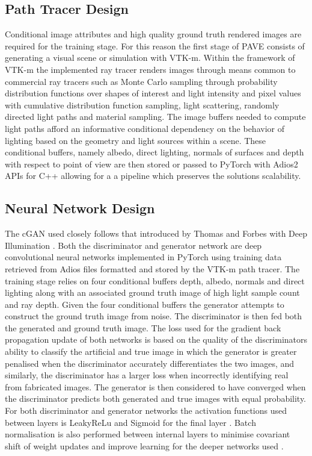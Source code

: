 \documentclass[conference]{IEEEtran}
\begin{document}
\subsection{Path Tracer Design}

Conditional image attributes and high quality ground truth rendered images are required for the training stage. For this reason the first stage of PAVE consists of generating a visual scene or simulation with VTK-m. Within the framework of VTK-m the implemented ray tracer renders images through means common to commercial ray tracers such as Monte Carlo sampling through probability distribution functions over shapes of interest and light intensity and pixel values with cumulative distribution function sampling, light scattering, randomly directed light paths and material sampling. The image buffers needed to compute light paths afford an informative conditional dependency on the behavior of lighting based on the geometry and light sources within a scene. These conditional buffers, namely albedo, direct lighting, normals of surfaces and depth with respect to point of view are then stored or passed to PyTorch with Adios2 APIs for C++ allowing for a a pipeline which preserves the solutions scalability. 

\subsection{Neural Network Design}

The cGAN used closely follows that introduced by Thomas and Forbes with Deep Illumination \cite{deepillum}. Both the discriminator and generator network are deep convolutional neural networks implemented in PyTorch using training data retrieved from Adios files formatted and stored by the VTK-m path tracer. The training stage relies on four conditional buffers depth, albedo, normals and direct lighting along with an associated ground truth image of high light sample count and ray depth. Given the four conditional buffers the generator attempts to construct the ground truth image from noise. The discriminator is then fed both the generated and ground truth image. The loss used for the gradient back propagation update of both networks is based on the quality of the discriminators ability to classify the artificial and true image in which the generator is greater penalised when the discriminator accurately differentiates the two images, and similarly, the discriminator has a larger loss when incorrectly identifying real from fabricated images. The generator is then considered to have converged when the discriminator predicts both generated and true images with equal probability. For both discriminator and generator networks the activation functions used between layers is LeakyReLu and Sigmoid for the final layer \cite{maasLeaky}. Batch normalisation is also performed between internal layers to minimise covariant shift of weight updates and improve learning for the deeper networks used \cite{ioffeBatch}.
\end{document}
